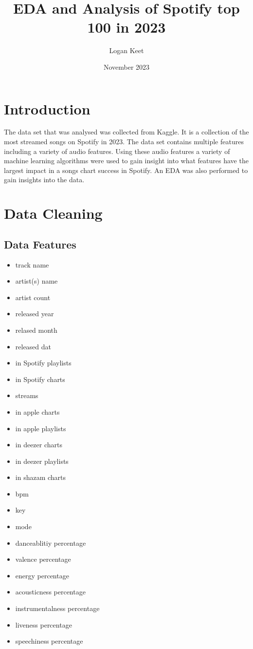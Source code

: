 \documentclass[titlepage]{article}
\title{EDA and Analysis of Spotify top 100 in 2023}
\author{Logan Keet}
\date{November 2023}
\begin{document}
\maketitle

\section*{Introduction} 
The data set that was analysed was collected from Kaggle. It is a collection of the most streamed songs on Spotify in 2023. The data set contains multiple features including a variety of audio features. Using these audio features a variety of machine learning algorithms were used to gain insight into what features have the largest impact in a songs chart success in Spotify. An EDA was also performed to gain insights into the data. 

\section*{Data Cleaning} 
\subsection*{Data Features} 
\begin{multicols}{3}
\begin{itemize}
    \item track name 
    \item artist(s) name 
    \item artist count 
    \item released year 
    \item relased month 
    \item released dat 
    \item in Spotify playlists 
    \item in Spotify charts  
    \item streams
    \item in apple charts 
    \item in apple playlists 
    \item in deezer charts 
    \item in deezer playlists 
    \item in shazam charts
    \item bpm 
    \item key 
    \item mode 
    \item danceablitiy percentage 
    \item valence percentage 
    \item energy percentage 
    \item acousticness percentage 
    \item instrumentalness percentage 
    \item liveness percentage 
    \item speechiness percentage
 \end{itemize} 
\end{multicols} 
\end{document}
